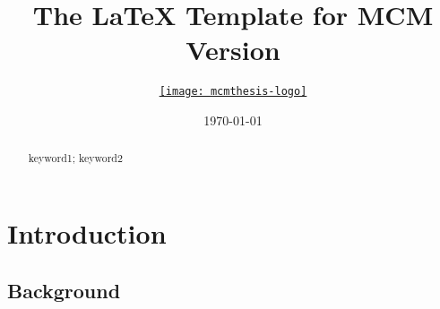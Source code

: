\documentclass{mcmthesis}
\title{The \LaTeX{} Template for MCM Version \MCMversion}
\author{\small \href{http://www.latexstudio.net/}
  {\texttt{[image: mcmthesis-logo]}}}
\date{\today}
\begin{document}
\begin{abstract}
\lipsum[1]
\begin{keywords}
keyword1; keyword2
\end{keywords}
\end{abstract}
\maketitle
\tableofcontents
 



\section{Introduction}
\subsection{Background}
\end{document}
